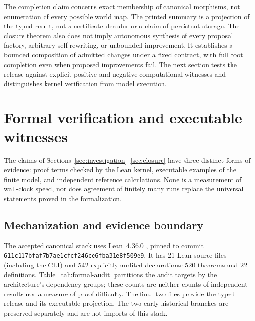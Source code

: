 \documentclass[10pt,letterpaper]{article}
\begin{document}
The completion claim concerns exact membership of canonical morphisms, not enumeration of every possible world map. The printed summary is a projection of the typed result, not a certificate decoder or a claim of persistent storage. The closure theorem also does not imply autonomous synthesis of every proposal factory, arbitrary self-rewriting, or unbounded improvement. It establishes a bounded composition of admitted changes under a fixed contract, with full root completion even when proposed improvements fail. The next section tests the release against explicit positive and negative computational witnesses and distinguishes kernel verification from model execution.
\clearpage
\section{Formal verification and executable witnesses}\label{sec:verification}
The claims of Sections~\ref{sec:investigation}--\ref{sec:closure} have three distinct forms of evidence: proof terms checked by the Lean kernel, executable examples of the finite model, and independent reference calculations. None is a measurement of wall-clock speed, nor does agreement of finitely many runs replace the universal statements proved in the formalization.

\subsection{Mechanization and evidence boundary}
The accepted canonical stack uses Lean~4.36.0 \cite{lean4}, pinned to commit\\
\texttt{611c117bfaf7b7ae1cfcf246ce6fba31e8f509e9}. It has 21 Lean source files (including the CLI) and 542 explicitly audited declarations: 520 theorems and 22 definitions. Table~\ref{tab:formal-audit} partitions the audit targets by the architecture's dependency groups; these counts are neither counts of independent results nor a measure of proof difficulty. The final two files provide the typed release and its executable projection. The two early historical branches are preserved separately and are not imports of this stack.
\end{document}
